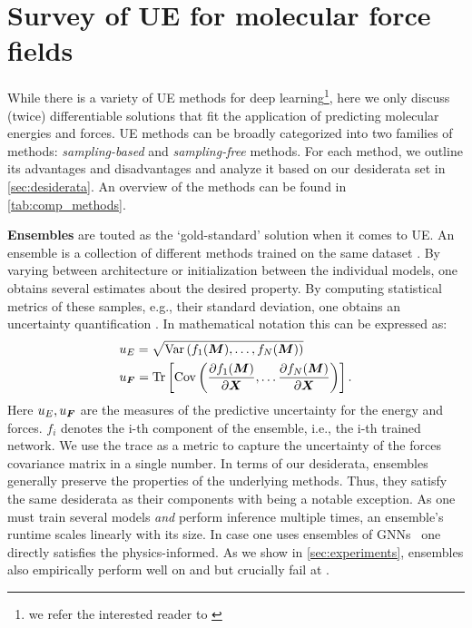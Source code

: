 \section{Survey of UE for molecular force fields}\label{sec:survey}
\begin{table}
    \centering
    \resizebox{\linewidth}{!}{
    
    }
    \caption{Desiderata fulfillment of different uncertainty estimation methods.}
    \label{tab:comp_methods}
\end{table}
While there is a variety of UE methods for deep learning\footnote{we refer the interested reader to \citet{gawlikowski2021survey}}, here we only discuss (twice) differentiable solutions that fit the application of predicting molecular energies and forces.
UE methods can be broadly categorized into two families of methods: \emph{sampling-based} and \emph{sampling-free} methods.
For each method, we outline its advantages and disadvantages and analyze it based on our desiderata set in \autoref{sec:desiderata}.
An overview of the methods can be found in \autoref{tab:comp_methods}.


\textbf{Ensembles} are touted as the `gold-standard' solution when it comes to UE.
An ensemble is a collection of different methods trained on the same dataset \cite{dataset-shift}.
By varying between architecture or initialization between the individual models, one obtains several estimates about the desired property.
By computing statistical metrics of these samples, e.g., their standard deviation, one obtains an uncertainty quantification \cite{ensembles}. In mathematical notation this can be expressed as: 
\begin{equation}\label{eq:ensemble_uncertainty_estimate}\begin{aligned}
    &u_{E} = \sqrt{\operatorname{Var} \left(f_1(\bm{M}), \dots, f_N(\bm{M})\right)}\\
    &u_{\bm{F}} = \operatorname{\text{Tr}} \left[\operatorname{Cov}\left(\frac{\partial f_1(\bm{M})}{\partial \bm{X}}, \dots \frac{\partial f_N(\bm{M})}{\partial \bm{X}} \right) \right].
\end{aligned}\end{equation}
Here $u_{E}, u_{\bm{F}}$ are the measures of the predictive uncertainty for the energy and forces. $f_i$ denotes the i-th component of the ensemble, i.e., the i-th trained network. We use the trace as a metric to capture the uncertainty of the forces covariance matrix in a single number.
In terms of our desiderata, ensembles generally preserve the properties of the underlying methods.
Thus, they satisfy the same desiderata as their components with \desseven{} being a notable exception.
As one must train several models \emph{and} perform inference multiple times, an ensemble's runtime scales linearly with its size. 
In case one uses ensembles of GNNs~\citep{gasteigerDirectionalMessagePassing2019} one directly satisfies the physics-informed. 
As we show in \autoref{sec:experiments}, ensembles also empirically perform well on \desfive{} and \dessix{} but crucially fail at \desseven{}.

